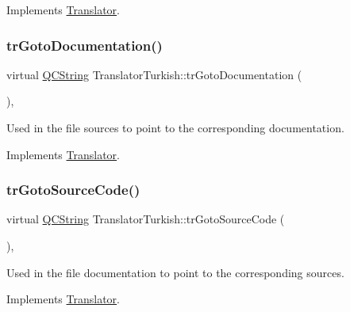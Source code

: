 Implements \mbox{\hyperlink{class_translator}{Translator}}.

\mbox{\label{class_translator_turkish_a5024e3293129400e26771d522f6add0c}} 
\subsubsection{\texorpdfstring{trGotoDocumentation()}{trGotoDocumentation()}}
{\footnotesize\ttfamily virtual \mbox{\hyperlink{class_q_c_string}{Q\+C\+String}} Translator\+Turkish\+::tr\+Goto\+Documentation (\begin{DoxyParamCaption}{ }\end{DoxyParamCaption})\hspace{0.3cm}{\ttfamily [inline]}, {\ttfamily [virtual]}}

Used in the file sources to point to the corresponding documentation. 

Implements \mbox{\hyperlink{class_translator}{Translator}}.

\mbox{\label{class_translator_turkish_a14b7669be9ec1c35bff502ba681b8fa5}} 
\subsubsection{\texorpdfstring{trGotoSourceCode()}{trGotoSourceCode()}}
{\footnotesize\ttfamily virtual \mbox{\hyperlink{class_q_c_string}{Q\+C\+String}} Translator\+Turkish\+::tr\+Goto\+Source\+Code (\begin{DoxyParamCaption}{ }\end{DoxyParamCaption})\hspace{0.3cm}{\ttfamily [inline]}, {\ttfamily [virtual]}}

Used in the file documentation to point to the corresponding sources. 

Implements \mbox{\hyperlink{class_translator}{Translator}}.

\mbox{\label{class_translator_turkish_aa0670c1105b9c3a7c07e019c5fd31fac}} 
